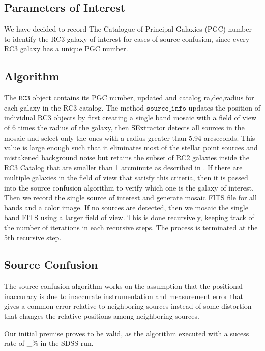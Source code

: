 \documentclass[5p]{elsarticle}
\begin{document}
		\subsection{Parameters of Interest}
	We have decided to record The Catalogue of Principal Galaxies (PGC) number to identify the RC3 galaxy of interest for cases of source confusion, since every RC3 galaxy has a unique PGC number. 

	\subsection{Algorithm}
	The $\texttt{RC3}$ object contains its  PGC number, updated and catalog ra,dec,radius for each galaxy in the RC3 catalog. The method $\texttt{source\_info}$ updates the position of individual RC3 objects by first creating a single band mosaic with a field of view of 6 times the radius of the galaxy, then SExtractor detects all sources in the mosaic and select only the ones with a radius greater than 5.94 arcseconds. This value is large enough such that it eliminates most of the stellar point sources and mistakened background noise  but retains the subset of RC2 galaxies inside the RC3 Catalog that are smaller than 1 arcminute as described in \citet{rc2}. If there are multiple galaxies in the field of view that satisfy this criteria, then it is passed into the source confusion algorithm to verify which one is the galaxy of interest. Then we record the single source of interest and generate mosaic FITS file for all bands and a color image. If no sources are detected, then we mosaic  the single band FITS using a larger field of view. This is done recursively, keeping track of the number of iterations in each recursive steps. The process is terminated at the 5th recursive step. %
	\subsection{Source Confusion}
	The source confusion algorithm works on the assumption that the positional inaccuracy is due to inaccurate instrumentation and measurement error that gives a common error relative to neighboring sources instead of some distortion that changes the relative positions among neighboring sources. 
	
	Our initial premise proves to be valid, as the algorithm executed with a sucess rate of \_\% in the SDSS run. 
\end{document}
